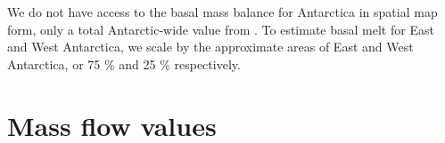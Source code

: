 \documentclass[review,jog]{igs}
\begin{document}
We do not have access to the basal mass balance for Antarctica in spatial map form, only a total Antarctic-wide value from \citet{pattyn_2010}. To estimate basal melt for East and West Antarctica, we scale by the approximate areas of East and West Antarctica, or 75 \% and 25 \% respectively.

\section{Mass flow values}

      
      

\end{document}
